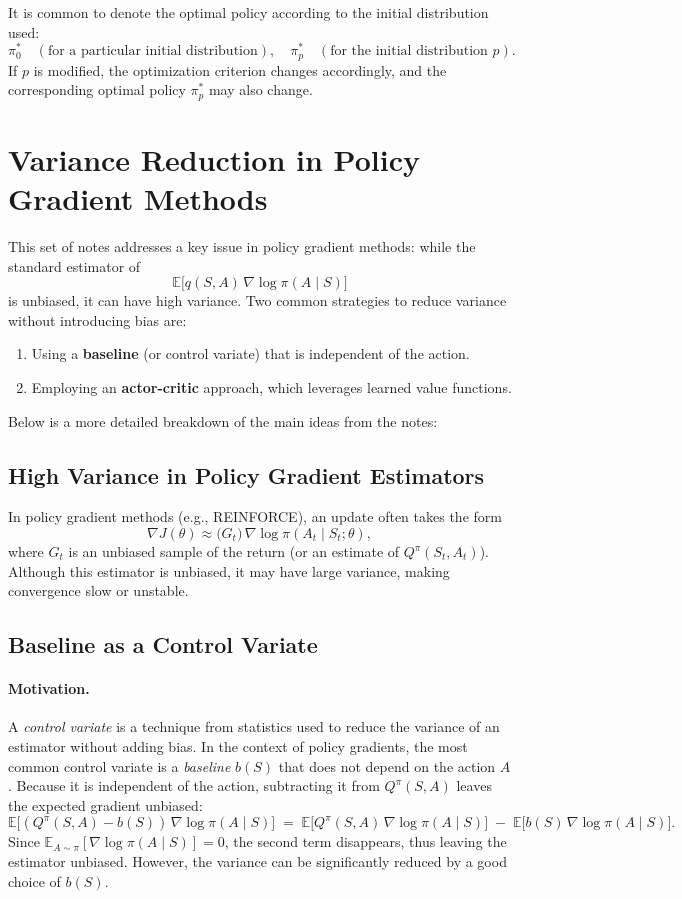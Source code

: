 It is common to denote the optimal policy according to the initial distribution used:
\[
  \pi^*_0 \quad (\text{for a particular initial distribution}), 
  \quad
  \pi^*_{p} \quad (\text{for the initial distribution } p).
\]
If \(p\) is modified, the optimization criterion changes accordingly, and the corresponding optimal policy \(\pi^*_p\) may also change.

\section{Variance Reduction in Policy Gradient Methods}

This set of notes addresses a key issue in policy gradient methods: while the standard estimator of
\[
  \mathbb{E}\bigl[q(S,A) \,\nabla \log \pi(A \mid S)\bigr]
\]
is unbiased, it can have high variance. Two common strategies to reduce variance without introducing bias are:
\begin{enumerate}
    \item Using a \textbf{baseline} (or control variate) that is independent of the action.
    \item Employing an \textbf{actor-critic} approach, which leverages learned value functions.
\end{enumerate}

Below is a more detailed breakdown of the main ideas from the notes:

\subsection{High Variance in Policy Gradient Estimators}
In policy gradient methods (e.g., REINFORCE), an update often takes the form
\[
  \nabla J(\theta) 
  \approx 
  \bigl(G_t\bigr) \,\nabla \log \pi(A_t \mid S_t; \theta),
\]
where \(G_t\) is an unbiased sample of the return (or an estimate of \(Q^\pi(S_t, A_t)\)). Although this estimator is unbiased, it may have large variance, making convergence slow or unstable.

\subsection{Baseline as a Control Variate}

\paragraph{Motivation.}
A \emph{control variate} is a technique from statistics used to reduce the variance of an estimator without adding bias. In the context of policy gradients, the most common control variate is a \emph{baseline} \(b(S)\) that does not depend on the action \(A\). Because it is independent of the action, subtracting it from \(Q^\pi(S,A)\) leaves the expected gradient unbiased:
\[
  \mathbb{E}\bigl[(Q^\pi(S,A) - b(S)) \,\nabla \log \pi(A \mid S)\bigr]
  \;=\;
  \mathbb{E}\bigl[Q^\pi(S,A)\,\nabla \log \pi(A \mid S)\bigr]
  \;-\;
  \mathbb{E}\bigl[b(S)\,\nabla \log \pi(A \mid S)\bigr].
\]
Since \(\mathbb{E}_{A\sim \pi}[\nabla \log \pi(A \mid S)] = 0\), the second term disappears, thus leaving the estimator unbiased. However, the variance can be significantly reduced by a good choice of \(b(S)\).

